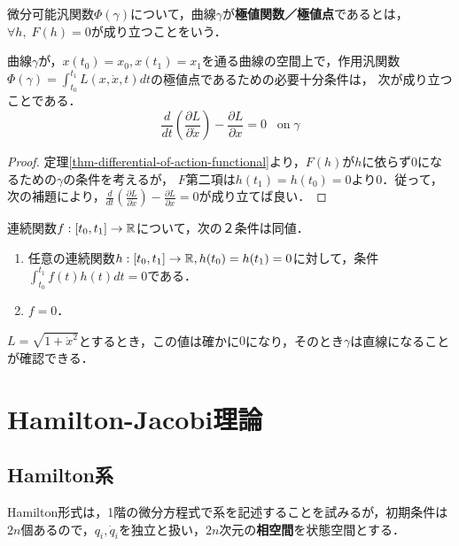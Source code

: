\documentclass[uplatex, dvipdfmx]{jsreport}
\begin{document}
\begin{definition}[extremal]
    微分可能汎関数$\Phi(\gamma)$について，曲線$\gamma$が\textbf{極値関数／極値点}であるとは，$\forall h,\; F(h)=0$が成り立つことをいう．
\end{definition}

\begin{theorem}\label{thm-EL-equation}
    曲線$\gamma$が，$x(t_0)=x_0,x(t_1)=x_1$を通る曲線の空間上で，作用汎関数$\Phi(\gamma)=\int^{t_1}_{t_0}L(x,\dot{x},t)dt$の極値点であるための必要十分条件は，
    次が成り立つことである．
    \[ \frac{d}{dt}\left(\frac{\partial L}{\partial\dot{x}}\right) - \frac{\partial L}{\partial x} = 0\;\;\;\mathrm{on\;}\gamma \]
\end{theorem}
\begin{proof}
    定理\ref{thm-differential-of-action-functional}より，$F(h)$が$h$に依らず$0$になるための$\gamma$の条件を考えるが，
    $F$第二項は$h(t_1)=h(t_0)=0$より$0$．従って，次の補題により，$\frac{d}{dt}\left(\frac{\partial L}{\partial\dot{x}}\right) - \frac{\partial L}{\partial x} = 0$が成り立てば良い．
\end{proof}

\begin{lemma}
    連続関数$f:[t_0,t_1]\to\mathbb{R}$について，次の２条件は同値．
    \begin{enumerate}
        \item 任意の連続関数$h:[t_0,t_1]\to\mathbb{R}, h(t_0)=h(t_1)=0$に対して，条件$\int^{t_1}_{t_0}f(t)h(t)dt=0$である．
        \item $f=0$．
    \end{enumerate}
\end{lemma}

\begin{example}
    $L=\sqrt{1+\dot{x}^2}$とするとき，この値は確かに$0$になり，そのとき$\gamma$は直線になることが確認できる．
\end{example}

\chapter{Hamilton-Jacobi理論}

\section{Hamilton系}

\begin{tcolorbox}[colframe=ForestGreen, colback=ForestGreen!10!white,breakable,colbacktitle=ForestGreen!40!white,coltitle=black,fonttitle=\bfseries\sffamily,
title=]
    Hamilton形式は，1階の微分方程式で系を記述することを試みるが，初期条件は$2n$個あるので，$q_i,\dot{q}_i$を独立と扱い，$2n$次元の\textbf{相空間}を状態空間とする．
\end{tcolorbox}
\end{document}
